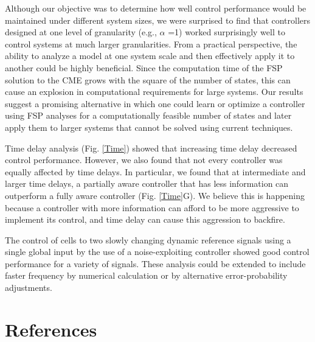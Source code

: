 \documentclass[12pt]{iopart}
\begin{document}
Although our objective was to determine how well control performance would be maintained under different system sizes, we were surprised to find that controllers designed at one level of granularity (e.g., $\alpha$ =1) worked surprisingly well to control systems at much larger granularities. 
From a practical perspective, the ability to analyze a model at one system scale and then effectively apply it to another could be highly beneficial. 
Since the computation time of the FSP solution to the CME grows with the square of the number of states, this can cause an explosion in computational requirements for large systems. 
Our results suggest a promising alternative in which one could learn or optimize a controller using FSP analyses for a computationally feasible number of states and later apply them to larger systems that cannot be solved using current techniques.

Time delay analysis (Fig. \ref{Time}) showed that increasing time delay decreased control performance. However, we also found that not every controller was equally affected by time delays. In particular, we found that at intermediate and larger time delays, a partially aware controller that has  less information can outperform a fully aware controller (Fig. \ref{Time}G). We believe this is happening because a controller with more information can afford to be more aggressive to implement its control, and time delay can cause this aggression to backfire.

The control of cells to two slowly changing dynamic reference signals using a single global input by the use of a noise-exploiting controller showed good control performance for a variety of signals. These analysis could be extended to include faster frequency by numerical calculation or by alternative error-probability adjustments.

\section*{References}


\end{document}
